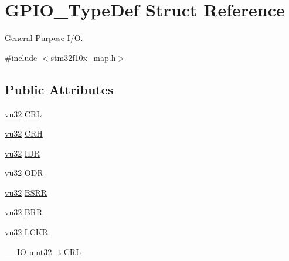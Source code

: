 \hypertarget{struct_g_p_i_o___type_def}{}\section{G\+P\+I\+O\+\_\+\+Type\+Def Struct Reference}
\label{struct_g_p_i_o___type_def}


General Purpose I/O.  




{\ttfamily \#include $<$stm32f10x\+\_\+map.\+h$>$}

\subsection*{Public Attributes}
\begin{DoxyCompactItemize}
\item 
\hyperlink{agilefox_2library_2inc_2stm32f10x__type_8h_a6e2761f0a1011f84ed96b946f2c8a563}{vu32} \hyperlink{struct_g_p_i_o___type_def_ac6b2e8ad37742e5b91815bd113e13c53}{C\+RL}
\item 
\hyperlink{agilefox_2library_2inc_2stm32f10x__type_8h_a6e2761f0a1011f84ed96b946f2c8a563}{vu32} \hyperlink{struct_g_p_i_o___type_def_abad9580ac00c89acadd6d5145436d124}{C\+RH}
\item 
\hyperlink{agilefox_2library_2inc_2stm32f10x__type_8h_a6e2761f0a1011f84ed96b946f2c8a563}{vu32} \hyperlink{struct_g_p_i_o___type_def_a1c58da24e118c30a2e0fbc13a2639c5e}{I\+DR}
\item 
\hyperlink{agilefox_2library_2inc_2stm32f10x__type_8h_a6e2761f0a1011f84ed96b946f2c8a563}{vu32} \hyperlink{struct_g_p_i_o___type_def_a9c7de5aa4d2a71a4865e176795a146ed}{O\+DR}
\item 
\hyperlink{agilefox_2library_2inc_2stm32f10x__type_8h_a6e2761f0a1011f84ed96b946f2c8a563}{vu32} \hyperlink{struct_g_p_i_o___type_def_a556de0261a76d1d76bc18a9c6167ae55}{B\+S\+RR}
\item 
\hyperlink{agilefox_2library_2inc_2stm32f10x__type_8h_a6e2761f0a1011f84ed96b946f2c8a563}{vu32} \hyperlink{struct_g_p_i_o___type_def_a48ec6ad5691ca7969e46823a71e14745}{B\+RR}
\item 
\hyperlink{agilefox_2library_2inc_2stm32f10x__type_8h_a6e2761f0a1011f84ed96b946f2c8a563}{vu32} \hyperlink{struct_g_p_i_o___type_def_a0e88914f49c0296dd4fa1323f65b0b0d}{L\+C\+KR}
\item 
\hyperlink{group___c_m_s_i_s___c_m3__core__definitions_gaec43007d9998a0a0e01faede4133d6be}{\+\_\+\+\_\+\+IO} \hyperlink{_p_e___types_8h_a33594304e786b158f3fb30289278f5af}{uint32\+\_\+t} \hyperlink{struct_g_p_i_o___type_def_a218d21e9ca712cec4ca8f00406b2ec29}{C\+RL}

\end{DoxyCompactItemize}
